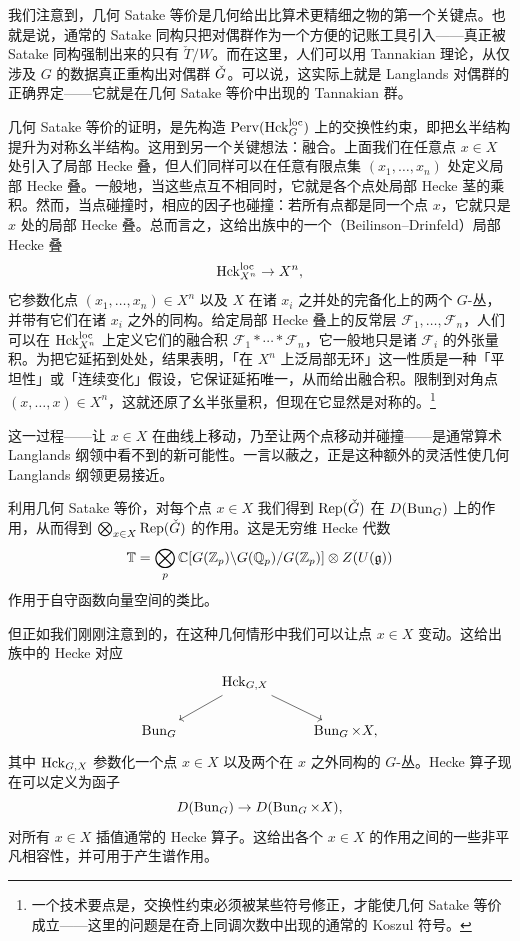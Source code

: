 我们注意到，几何 Satake 等价是几何给出比算术更精细之物的第一个关键点。也就是说，通常的 Satake 同构只把对偶群作为一个方便的记账工具引入——真正被 Satake 同构强制出来的只有 $\check T/W$。而在这里，人们可以用 Tannakian 理论，从仅涉及 $G$ 的数据真正重构出对偶群 $\check{G}$。可以说，这实际上就是 Langlands 对偶群的正确界定——它就是在几何 Satake 等价中出现的 Tannakian 群。

\begin{remark}
几何 Satake 等价的证明，是先构造 $\operatorname{Perv}(\operatorname{Hck}^{\mathrm{loc}}_G)$ 上的交换性约束，即把幺半结构提升为对称幺半结构。这用到另一个关键想法：融合。上面我们在任意点 $x \in X$ 处引入了局部 Hecke 叠，但人们同样可以在任意有限点集 $(x_1,\ldots,x_n)$ 处定义局部 Hecke 叠。一般地，当这些点互不相同时，它就是各个点处局部 Hecke 茎的乘积。然而，当点碰撞时，相应的因子也碰撞：若所有点都是同一个点 $x$，它就只是 $x$ 处的局部 Hecke 叠。总而言之，这给出族中的一个（Beilinson–Drinfeld）局部 Hecke 叠
\[
\operatorname{Hck}^{\mathrm{loc}}_{X^n} \to X^n,
\]
它参数化点 $(x_1,\ldots,x_n) \in X^n$ 以及 $X$ 在诸 $x_i$ 之并处的完备化上的两个 $G$-丛，并带有它们在诸 $x_i$ 之外的同构。给定局部 Hecke 叠上的反常层 $\mathcal{F}_1,\ldots,\mathcal{F}_n$，人们可以在 $\operatorname{Hck}^{\mathrm{loc}}_{X^n}$ 上定义它们的融合积 $\mathcal{F}_1 * \cdots * \mathcal{F}_n$，它一般地只是诸 $\mathcal{F}_i$ 的外张量积。为把它延拓到处处，结果表明，「在 $X^n$ 上泛局部无环」这一性质是一种「平坦性」或「连续变化」假设，它保证延拓唯一，从而给出融合积。限制到对角点 $(x,\ldots,x) \in X^n$，这就还原了幺半张量积，但现在它显然是对称的。\footnote{一个技术要点是，交换性约束必须被某些符号修正，才能使几何 Satake 等价成立——这里的问题是在奇上同调次数中出现的通常的 Koszul 符号。}
\end{remark}

这一过程——让 $x \in X$ 在曲线上移动，乃至让两个点移动并碰撞——是通常算术 Langlands 纲领中看不到的新可能性。一言以蔽之，正是这种额外的灵活性使几何 Langlands 纲领更易接近。

利用几何 Satake 等价，对每个点 $x \in X$ 我们得到 $\operatorname{Rep}(\check{G})$ 在 $D(\operatorname{Bun}_G)$ 上的作用，从而得到 $\bigotimes_{x \in X}\operatorname{Rep}(\check{G})$ 的作用。这是无穷维 Hecke 代数
\[
\mathbb{T} = \bigotimes_p \mathbb{C}[G(\mathbb{Z}_p)\backslash G(\mathbb{Q}_p)/G(\mathbb{Z}_p)] \otimes Z(U(\mathfrak{g}))
\]
作用于自守函数向量空间的类比。

但正如我们刚刚注意到的，在这种几何情形中我们可以让点 $x \in X$ 变动。这给出族中的 Hecke 对应
\[
\begin{tikzcd}
& \Hck_{G,X} \arrow[dl] \arrow[dr] & \\
\Bun_G & & \Bun_G \times X,
\end{tikzcd}
\]
其中 $\operatorname{Hck}_{G,X}$ 参数化一个点 $x \in X$ 以及两个在 $x$ 之外同构的 $G$-丛。Hecke 算子现在可以定义为函子
\[
D(\operatorname{Bun}_G) \to D(\operatorname{Bun}_G \times X),
\]
对所有 $x \in X$ 插值通常的 Hecke 算子。这给出各个 $x \in X$ 的作用之间的一些非平凡相容性，并可用于产生谱作用。

